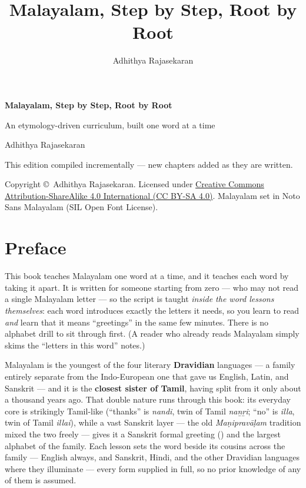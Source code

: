 \documentclass[11pt,twoside]{book}
\title{\Huge Malayalam, Step by Step, Root by Root}
\author{Adhithya Rajasekaran}
\date{}
\begin{document}
\frontmatter

\begin{titlepage}
  \centering
  \vspace*{3cm}
  {\Huge\bfseries Malayalam, Step by Step, Root by Root\par}
  \vspace{1cm}
  {\Large An etymology-driven curriculum, built one word at a time\par}
  \vspace{1.5cm}
  {\large Adhithya Rajasekaran\par}
  \vfill
  {\large This edition compiled incrementally --- new chapters added as they
  are written.\par}
  \vspace{2cm}
  {\normalsize
    Copyright \copyright\ Adhithya Rajasekaran. Licensed under
    \href{https://creativecommons.org/licenses/by-sa/4.0/}%
    {Creative Commons Attribution-ShareAlike 4.0 International (CC BY-SA 4.0)}.
    Malayalam set in Noto Sans Malayalam (SIL Open Font License).\par
  }
\end{titlepage}

\chapter*{Preface}

This book teaches Malayalam one word at a time, and it teaches each word by taking
it apart. It is written for someone starting from zero --- who may not read a
single Malayalam letter --- so the script is taught \emph{inside the word
lessons themselves}: each word
introduces exactly the letters it needs, so you learn to read 
\emph{and} learn that it means ``greetings'' in the same few minutes. There is
no alphabet drill to sit through first. (A reader who already reads Malayalam
simply skims the ``letters in this word'' notes.)

Malayalam is the youngest of the four literary \textbf{Dravidian} languages ---
a family entirely separate from the Indo-European one that gave us English,
Latin, and Sanskrit --- and it is the \textbf{closest sister of Tamil}, having
split from it only about a thousand years ago. That double nature runs through
this book: its everyday core is strikingly Tamil-like (``thanks'' is
 \emph{nandi}, twin of Tamil \emph{naṉṟi}; ``no'' is 
\emph{illa}, twin of Tamil \emph{illai}), while a vast Sanskrit layer --- the
old \emph{Maṇipravāḷam} tradition mixed the two freely --- gives it a Sanskrit
formal greeting () and the largest alphabet of the family. Each
lesson sets the word beside its cousins across the family --- English always,
and Sanskrit, Hindi, and the other Dravidian languages where they illuminate
--- every form supplied in full, so no prior knowledge of any of them is
assumed.
\end{document}

